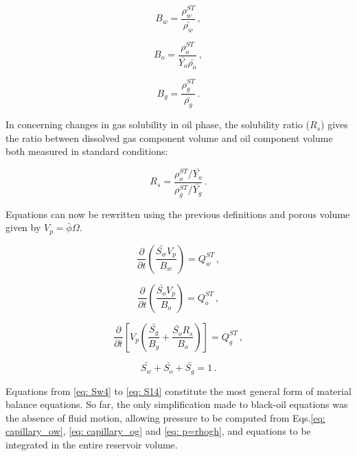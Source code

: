 \documentclass[authoryear,preprint,review,12pt]{elsarticle}
\begin{document}
\begin{equation}
B_w = \frac{\rho_w^{ST}}{\bar{\rho_w}} \, ,
\end{equation}

\begin{equation}
B_o = \frac{\rho_o^{ST}}{\bar{Y_o} \bar{\rho_o}} \, ,
\end{equation}

\begin{equation}
B_g = \frac{\rho_g^{ST}}{\bar{\rho_g}} \, .
\end{equation}

In concerning changes in gas solubility in oil phase, the solubility ratio ($R_s$) gives the ratio between dissolved gas component volume and oil component volume both measured in standard conditions:

\begin{equation}
R_s = \frac{\rho_o^{ST} / \bar{Y_o}}{\rho_g^{ST} / \bar{Y_g}} \, .
\end{equation}



Equations can now be rewritten using the previous definitions and porous volume given by $V_p = \bar{\phi}\Omega$.

\begin{equation}\label{eq: Sw4}
\frac{\partial}{\partial t} \left(\frac{\bar{S_w} V_p}{B_w} \right) = Q_w^{ST} \, ,
\end{equation}

\begin{equation}\label{eq: So4}
\frac{\partial}{\partial t} \left(\frac{\bar{S_o} V_p}{B_o} \right) = Q_o^{ST} \, ,
\end{equation}

\begin{equation}\label{eq: Sg4}
\frac{\partial}{\partial t} \left[ V_p \left(\frac{\bar{S_g}}{B_g} + \frac{\bar{S_o} R_s}{B_o} \right) \right] = Q_g^{ST} \, ,
\end{equation}

\begin{equation}\label{eq: S14}
\bar{S_w}+\bar{S_o}+\bar{S_g}=1 \, .
\end{equation}

Equations from \eqref{eq: Sw4} to \eqref{eq: S14} constitute the most general form of material balance equations. So far, the only simplification made to black-oil equations was the absence of fluid motion, allowing pressure to be computed from Eqs.\eqref{eq: capillary_ow}, \eqref{eq: capillary_og} and \eqref{eq: p=rhogh}, and equations to be integrated in the entire reservoir volume.
\end{document}

